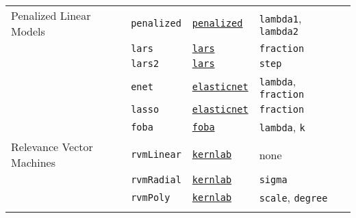 \documentclass[12pt]{article}
\begin{document}
\begin{landscape}
\begin{longtable}{lllll}
\rowcolor[rgb]{.95, .95, .95}               
      Penalized Linear Models  &
         \texttt{penalized} & 
             {\tt \href{http://cran.r-project.org/web/packages/penalized/index.html}{penalized}}      & 
            \texttt{lambda1}, \texttt{lambda2} &  \\            
\rowcolor[rgb]{.95, .95, .95}          
       &
         \texttt{lars} & 
             {\tt \href{http://cran.r-project.org/web/packages/lars/index.html}{lars}}      & 
            \texttt{fraction} & \\   
\rowcolor[rgb]{.95, .95, .95}               
         &
         \texttt{lars2} & 
             {\tt \href{http://cran.r-project.org/web/packages/lars/index.html}{lars}}        & 
            \texttt{step} & \\            
\rowcolor[rgb]{.95, .95, .95}                   
      &
         \texttt{enet} & 
             {\tt \href{http://cran.r-project.org/web/packages/elasticnet/index.html}{elasticnet}}      & 
            \texttt{lambda}, \texttt{fraction} & \\          
\rowcolor[rgb]{.95, .95, .95}   
      &
         \texttt{lasso} & 
             {\tt \href{http://cran.r-project.org/web/packages/elasticnet/index.html}{elasticnet}}      & 
            \texttt{fraction} & \\       
\rowcolor[rgb]{.95, .95, .95}         
       &
         \texttt{foba} & 
             {\tt \href{http://cran.r-project.org/web/packages/foba/index.html}{foba}}       & 
            \texttt{lambda}, \texttt{k} & \\    
                              
      Relevance Vector Machines  &
         \texttt{rvmLinear} & 
             {\tt \href{http://cran.r-project.org/web/packages/kernlab/index.html}{kernlab}}        & 
            none & \\            
             
  &
         \texttt{rvmRadial} & 
            {\tt \href{http://cran.r-project.org/web/packages/kernlab/index.html}{kernlab}}       & 
            \texttt{sigma} & \\              
           
  &
         \texttt{rvmPoly} & 
            {\tt \href{http://cran.r-project.org/web/packages/kernlab/index.html}{kernlab}}       & 
            \texttt{scale}, \texttt{degree} & \\                        

\rowcolor[rgb]{.95, .95, .95}
            

\end{longtable}
\end{landscape}
\end{document}
